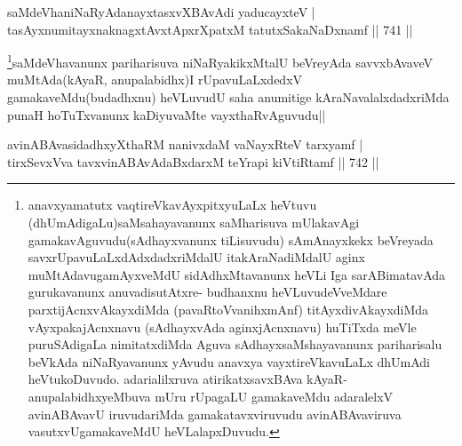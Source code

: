 \begin{shl}
saMdeVhaniNaRyAdanayxtasxvXBAvAdi yaducayxteV | \\
tasAyxnumitayxnaknagxtAvxtApxrXpatxM tatutxSakaNaDxnamf \hfill||  741 ||  
\end{shl}

\begin{artha}
\footnote{anavxyamatutx vaqtireVkavAyxpitxyuLaLx heVtuvu (dhUmAdigaLu)saMsahayavanunx saMharisuva mUlakavAgi gamakavAguvudu(sAdhayxvanunx tiLisuvudu) sAmAnayxkekx beVreyada savxrUpavuLaLxdAdxdadxriMdalU itakAraNadiMdalU aginx muMtAdavugamAyxveMdU sidAdhxMtavanunx heVLi Iga sarABimatavAda gurukavanunx anuvadisutAtxre- budhanxnu heVLuvudeVveMdare parxtijAcnxvAkayxdiMda (pavaRtoVvanihxmAnf) titAyxdivAkayxdiMda vAyxpakajAcnxnavu (sAdhayxvAda aginxjAcnxnavu) huTiTxda meVle puruSAdigaLa nimitatxdiMda Aguva sAdhayxsaMshayavanunx pariharisalu beVkAda niNaRyavanunx yAvudu anavxya vayxtireVkavuLaLx dhUmAdi heVtukoDuvudo. adarialilxruva atirikatxsavxBAva kAyaR- anupalabidhxyeMbuva mUru rUpagaLU gamakaveMdu adaralelxV avinABAvavU iruvudariMda gamakatavxviruvudu avinABAvaviruva vasutxvUgamakaveMdU heVLalapxDuvudu.}saMdeVhavanunx pariharisuva niNaRyakikxMtalU beVreyAda savvxbAvaveV  muMtAda(kAyaR, anupalabidhx)I rUpavuLaLxdedxV gamakaveMdu(budadhxnu) heVLuvudU saha anumitige kAraNavalalxdadxriMda punaH hoTuTxvanunx kaDiyuvaMte vayxthaRvAguvudu||
\end{artha}


\begin{shl}
avinABAvasidadhxyXthaRM nanivxdaM vaNayxRteV tarxyamf | \\
tirxSevxVva tavxvinABAvAdaBxdarxM teYrapi kiVtiRtamf \hfill||  742 ||  
\end{shl}

